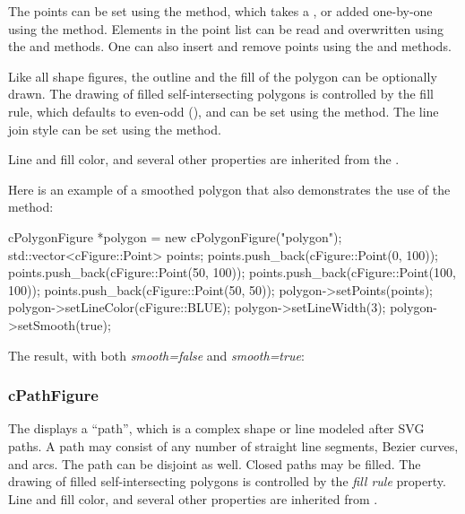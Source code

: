 The points can be set using the  method, which takes a ,
or added one-by-one using the  method. Elements in the point list can be
read and overwritten using the  and  methods. One can also
insert and remove points using the  and  methods.

Like all shape figures, the outline and the fill of the polygon can be optionally drawn.
The drawing of filled self-intersecting polygons is controlled
by the fill rule, which defaults to even-odd (), and
can be set using the  method. The line join style can be set using
the  method.

Line and fill color, and several other properties are inherited from
the .

Here is an example of a smoothed polygon that also demonstrates
the use of the  method:

\begin{cpp}
cPolygonFigure *polygon = new cPolygonFigure("polygon");
std::vector<cFigure::Point> points;
points.push_back(cFigure::Point(0, 100));
points.push_back(cFigure::Point(50, 100));
points.push_back(cFigure::Point(100, 100));
points.push_back(cFigure::Point(50, 50));
polygon->setPoints(points);
polygon->setLineColor(cFigure::BLUE);
polygon->setLineWidth(3);
polygon->setSmooth(true);
\end{cpp}


The result, with both \textit{smooth=false} and \textit{smooth=true}:

\begin{center}

\end{center}


\subsubsection{cPathFigure}
\label{sec:graphics:pathfigure}

The  displays a ``path'', which is a complex shape or line modeled after SVG
paths. A path may consist of any number of straight line segments, Bezier
curves, and arcs. The path can be disjoint as well. Closed paths may be filled.
The drawing of filled self-intersecting polygons is controlled by the
\textit{fill rule} property. Line and fill color, and several other properties
are inherited from .

